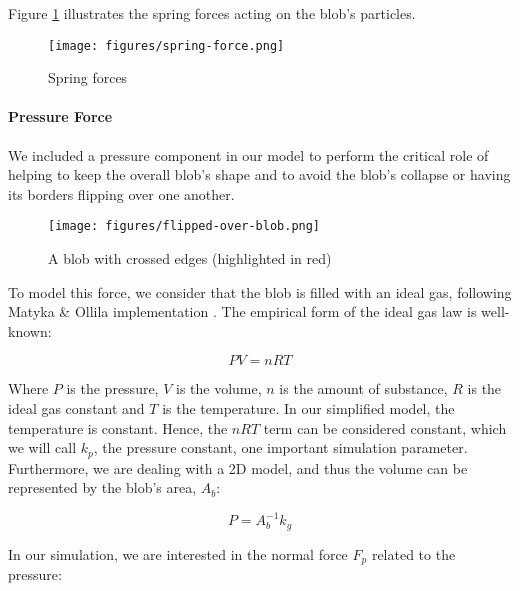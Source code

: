 \documentclass[manuscript, screen]{timtm}
\begin{document}
Figure \ref{fig:spring-force} illustrates the spring forces acting on the blob's particles.

\begin{figure}[h]
  \centering
  \texttt{[image: figures/spring-force.png]}
  \caption{Spring forces}
  \label{fig:spring-force}
\end{figure}

\paragraph{Pressure Force}

We included a pressure component in our model to perform the critical role of helping to keep the overall blob's shape and to avoid the blob's collapse or having its borders flipping over one another.

\begin{figure}[h]
  \centering
  \texttt{[image: figures/flipped-over-blob.png]}
  \caption{A blob with crossed edges (highlighted in red)}
  \label{fig:flipped-over}
\end{figure}

To model this force, we consider that the blob is filled with an ideal gas, following Matyka \& Ollila implementation \cite{pressure-MaciejMatyka2004PMoS, matyka2004implement}. The empirical form of the ideal gas law is well-known:

\[PV = nRT \]

Where $P$ is the pressure, $V$ is the volume, $n$ is the amount of substance, $R$ is the ideal gas constant and $T$ is the temperature. In our simplified model, the temperature is constant. Hence, the $nRT$ term can be considered constant, which we will call $k_p$, the pressure constant, one important simulation parameter. Furthermore, we are dealing with a 2D model, and thus the volume can be represented by the blob's area, $A_b$:

\begin{equation} \label{eq:pressure}
P = A_b^{-1} k_g
\end{equation}


In our simulation, we are interested in the normal force $F_p$ related to the pressure:
\end{document}
